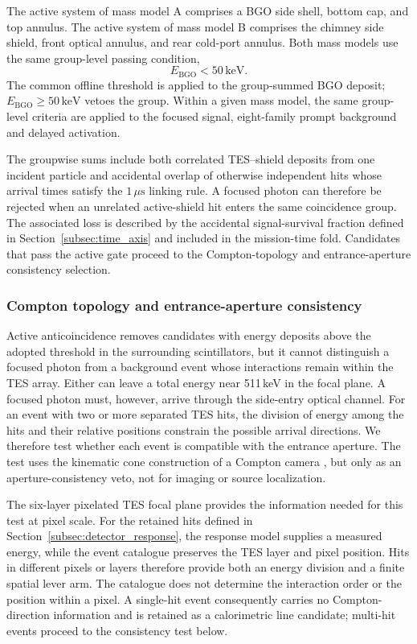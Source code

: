 \documentclass[11pt]{article}
\newcommand{\keV}{\ensuremath{\,\mathrm{keV}}}
\begin{document}
The active system of mass model A comprises a BGO side shell, bottom cap, and
top annulus. The active system of mass model B comprises the chimney side
shield, front optical annulus, and rear cold-port annulus. Both mass models use
the same group-level passing condition,
\[
 E_{\mathrm{BGO}}<50\keV .
\]
The common offline threshold is applied to the group-summed BGO deposit;
$E_{\mathrm{BGO}}\geq50\keV$ vetoes the group.
Within a given mass model, the same group-level criteria are applied to the
focused signal, eight-family prompt background and delayed
activation.

The groupwise sums include both correlated TES--shield deposits from one
incident particle and accidental overlap of otherwise independent hits whose
arrival times satisfy the $1\,\mu\mathrm{s}$ linking rule. A focused photon can
therefore be rejected when an unrelated active-shield hit enters the same
coincidence group. The associated loss is described by the accidental
signal-survival fraction defined in Section~\ref{subsec:time_axis} and included
in the mission-time fold. Candidates that pass the active gate proceed to the
Compton-topology and entrance-aperture consistency selection.

\subsubsection{Compton topology and entrance-aperture consistency}

Active anticoincidence removes candidates with energy deposits above the adopted
threshold in the surrounding scintillators, but it cannot distinguish a focused photon from a
background event whose interactions remain within the TES array. Either can
leave a total energy near 511\,keV in the focal plane. A focused photon must,
however, arrive through the side-entry optical channel. For an event with two
or more separated TES hits, the division of energy among the hits and their
relative positions constrain the possible arrival directions. We therefore test
whether each event is compatible with the entrance aperture. The test uses the
kinematic cone construction of a Compton camera
\cite{Zoglauer2006}, but only as an aperture-consistency veto, not for imaging
or source localization.

The six-layer pixelated TES focal plane provides the information needed for
this test at pixel scale. For the retained hits defined in
Section~\ref{subsec:detector_response}, the response model supplies a measured
energy, while the event catalogue preserves the TES layer and pixel position.
Hits in different pixels or layers therefore provide both an energy division
and a finite spatial lever arm. The catalogue does not determine the interaction
order or the position within a pixel. A single-hit event consequently carries
no Compton-direction information and is retained as a calorimetric line
candidate; multi-hit events proceed to the consistency test below.
\end{document}
